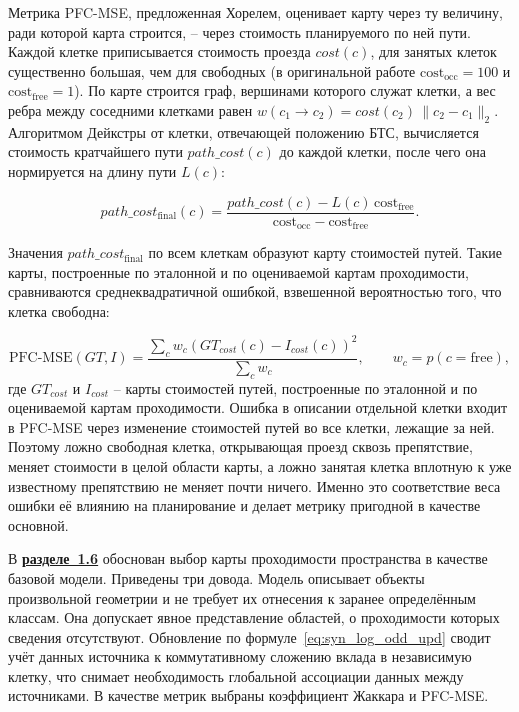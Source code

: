 Метрика PFC-MSE, предложенная Хорелем, оценивает карту через ту величину, ради которой карта строится, -- через стоимость планируемого по ней пути. Каждой клетке приписывается стоимость проезда $cost(c)$, для занятых клеток существенно большая, чем для свободных (в оригинальной работе $\text{cost}_\text{occ} = 100$ и $\text{cost}_\text{free} = 1$). По карте строится граф, вершинами которого служат клетки, а вес ребра между соседними клетками равен $w(c_1\rightarrow c_2) = cost(c_2)\,\lVert c_2 - c_1\rVert_2$. Алгоритмом Дейкстры от клетки, отвечающей положению БТС, вычисляется стоимость кратчайшего пути $path\_cost(c)$ до каждой клетки, после чего она нормируется на длину пути $L(c)$:

\begin{equation}
	path\_cost_\text{final}(c) = \dfrac{path\_cost(c) - L(c)\,\text{cost}_\text{free}}{\text{cost}_\text{occ} - \text{cost}_\text{free}}.
	\label{eq:syn_path_cost_norm}
\end{equation}

Значения $path\_cost_\text{final}$ по всем клеткам образуют карту стоимостей путей. Такие карты, построенные по эталонной и по оцениваемой картам проходимости, сравниваются среднеквадратичной ошибкой, взвешенной вероятностью того, что клетка свободна:

\begin{equation}
	\text{PFC-MSE}(GT, I) = \dfrac{\sum_c w_c\left(GT_{cost}(c) - I_{cost}(c)\right)^2}{\sum_c w_c},\qquad w_c = p(c = \text{free}),
	\label{eq:syn_pfc_mse}
\end{equation}
где $GT_{cost}$ и $I_{cost}$ -- карты стоимостей путей, построенные по эталонной и по оцениваемой картам проходимости. Ошибка в описании отдельной клетки входит в PFC-MSE через изменение стоимостей путей во все клетки, лежащие за ней. Поэтому ложно свободная клетка, открывающая проезд сквозь препятствие, меняет стоимости в целой области карты, а ложно занятая клетка вплотную к уже известному препятствию не меняет почти ничего. Именно это соответствие веса ошибки её влиянию на планирование и делает метрику пригодной в качестве основной.


В \underline{\textbf{разделе~1.6}} обоснован выбор карты проходимости пространства в качестве базовой модели. Приведены три довода. Модель описывает объекты произвольной геометрии и не требует их отнесения к заранее определённым классам. Она допускает явное представление областей, о проходимости которых сведения отсутствуют. Обновление по формуле~\eqref{eq:syn_log_odd_upd} сводит учёт данных источника к коммутативному сложению вклада в независимую клетку, что снимает необходимость глобальной ассоциации данных между источниками. В качестве метрик выбраны коэффициент Жаккара и PFC-MSE.

